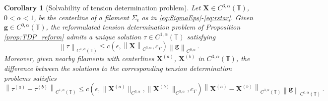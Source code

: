 \documentclass[11pt,reqno]{amsart}
\newcommand{\T}{\mathbb{T}}
\newcommand{\X}{\bm{X}}
\newcommand{\norm}[1]{\left\lVert #1 \right\rVert}
\newtheorem{corollary}[theorem]{Corollary}
\theoremstyle{definition}
\begin{document}


\begin{corollary}[Solvability of tension determination problem]\label{cor:TDP_solve}
Let $\X\in C^{3,\alpha}(\T)$, $0<\alpha<1$, be the centerline of a filament $\Sigma_\epsilon$ as in \eqref{eq:SigmaEps}-\eqref{eq:rstar}. Given $\bm{g}\in C^{0,\alpha}(\T)$, the reformulated tension determination problem of Proposition \ref{prop:TDP_reform} admits a unique solution $\tau\in C^{1,\alpha}(\T)$ satisfying 
  \begin{equation}
    \norm{\tau}_{C^{1,\alpha}(\T)} \le c(\epsilon,\norm{\X}_{C^{3,\alpha}},c_\Gamma)\norm{\bm{g}}_{C^{0,\alpha}}\,.
  \end{equation}
%
Moreover, given nearby filaments with centerlines $\X^{(a)}$, $\X^{(b)}$ in $C^{3,\alpha}(\T)$, the difference between the solutions to the corresponding tension determination problems satisfies 
  \begin{equation}
    \norm{\tau^{(a)}-\tau^{(b)}}_{C^{1,\alpha}(\T)} \le c(\epsilon,\|\X^{(a)}\|_{C^{3,\alpha}},\|\X^{(b)}\|_{C^{3,\alpha}},c_\Gamma)\norm{\X^{(a)}-\X^{(b)}}_{C^{3,\alpha}(\T)}\norm{\bm{g}}_{C^{0,\alpha}(\T)}\,.
  \end{equation}  
\end{corollary}
\end{document}
